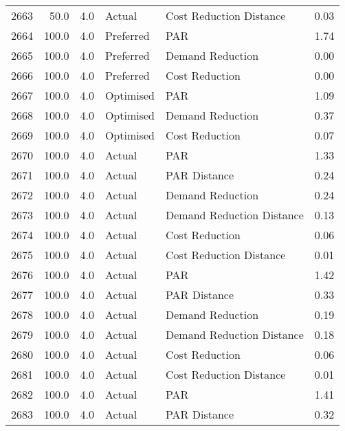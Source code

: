\begin{longtable}{lrrllr}
2663 &         50.0 &     4.0 &         Actual &    Cost Reduction Distance &   0.03 \\
2664 &        100.0 &     4.0 &      Preferred &                        PAR &   1.74 \\
2665 &        100.0 &     4.0 &      Preferred &           Demand Reduction &   0.00 \\
2666 &        100.0 &     4.0 &      Preferred &             Cost Reduction &   0.00 \\
2667 &        100.0 &     4.0 &      Optimised &                        PAR &   1.09 \\
2668 &        100.0 &     4.0 &      Optimised &           Demand Reduction &   0.37 \\
2669 &        100.0 &     4.0 &      Optimised &             Cost Reduction &   0.07 \\
2670 &        100.0 &     4.0 &         Actual &                        PAR &   1.33 \\
2671 &        100.0 &     4.0 &         Actual &               PAR Distance &   0.24 \\
2672 &        100.0 &     4.0 &         Actual &           Demand Reduction &   0.24 \\
2673 &        100.0 &     4.0 &         Actual &  Demand Reduction Distance &   0.13 \\
2674 &        100.0 &     4.0 &         Actual &             Cost Reduction &   0.06 \\
2675 &        100.0 &     4.0 &         Actual &    Cost Reduction Distance &   0.01 \\
2676 &        100.0 &     4.0 &         Actual &                        PAR &   1.42 \\
2677 &        100.0 &     4.0 &         Actual &               PAR Distance &   0.33 \\
2678 &        100.0 &     4.0 &         Actual &           Demand Reduction &   0.19 \\
2679 &        100.0 &     4.0 &         Actual &  Demand Reduction Distance &   0.18 \\
2680 &        100.0 &     4.0 &         Actual &             Cost Reduction &   0.06 \\
2681 &        100.0 &     4.0 &         Actual &    Cost Reduction Distance &   0.01 \\
2682 &        100.0 &     4.0 &         Actual &                        PAR &   1.41 \\
2683 &        100.0 &     4.0 &         Actual &               PAR Distance &   0.32 \\

\end{longtable}
